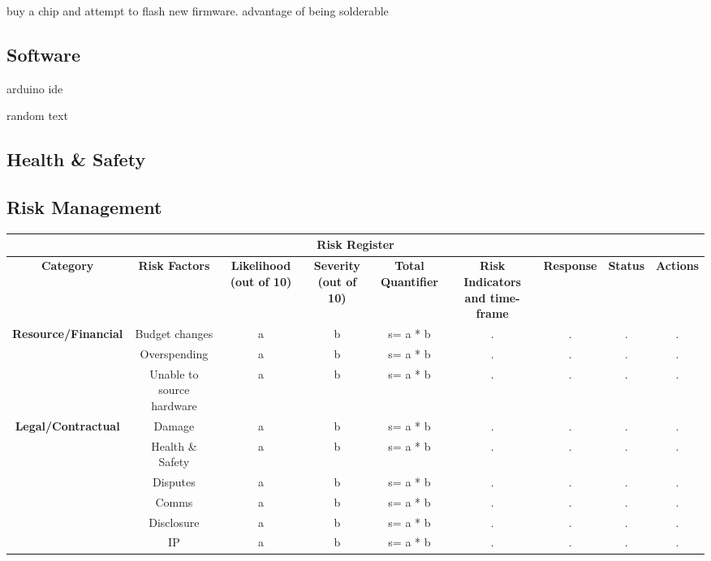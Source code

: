 \documentclass[11pt]{article}
\begin{document}
buy a chip and attempt to flash new firmware. advantage of being solderable

\subsection{Software}
arduino ide 

random text


\begin{landscape}
\section{Health \& Safety}
\subsection{Risk Management}
\centering
\begin{adjustbox}{width=1.8\textwidth,center=\textwidth} 
\begin{tabular}{ |c|c|c|c|c|c|c|c|c| }
\hline
\multicolumn{9}{|c|}{\large\textbf{Risk Register}} \\
\hline
\textbf{Category} & \textbf{Risk Factors} & \textbf{Likelihood (out of 10)} & \textbf{Severity (out of 10)} & \textbf{Total Quantifier} & \textbf{Risk Indicators and time-frame} & \textbf{Response} & \textbf{Status} & \textbf{Actions}\\
\hline
\multirow{3}{*}{\textbf{Resource/Financial}} 
& Budget changes            & a & b & s= a * b & . & . & . & . \\ \cline{2-9}
& Overspending              & a & b & s= a * b & . & . & . & . \\ \cline{2-9}
& Unable to source hardware & a & b & s= a * b & . & . & . & . \\ \cline{2-9}
\hline
\multirow{6}{*}{\textbf{Legal/Contractual}}
& Damage            & a & b & s= a * b & . & . & . & . \\ \cline{2-9}
& Health \& Safety  & a & b & s= a * b & . & . & . & . \\ \cline{2-9}
& Disputes          & a & b & s= a * b & . & . & . & . \\ \cline{2-9}
& Comms             & a & b & s= a * b & . & . & . & . \\ \cline{2-9}
& Disclosure        & a & b & s= a * b & . & . & . & . \\ \cline{2-9}
& IP                & a & b & s= a * b & . & . & . & . \\ \cline{2-9}
\hline

\end{tabular}
\end{adjustbox}
\end{landscape}
\end{document}
